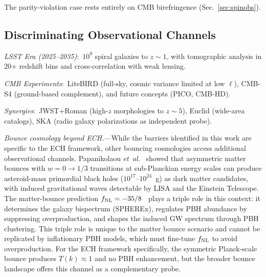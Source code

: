 \documentclass[aps,prd,twocolumn,superscriptaddress,showpacs,preprintnumbers,nofootinbib,longbibliography,floatfix]{revtex4-2}
\newcommand{\etal}{\textit{et~al.}}
\newcommand{\fnl}{f_{\rm NL}}
\begin{document}
The parity-violation case rests entirely on CMB birefringence (Sec.~\ref{sec:spinobs}).

\subsection{Discriminating Observational Channels}

\textit{LSST Era (2025--2035)}:~$10^9$ spiral galaxies to $z \sim 1$, with tomographic analysis in 20+ redshift bins and cross-correlation with weak lensing.

\textit{CMB Experiments}:~LiteBIRD (full-sky, cosmic variance limited at low $\ell$), CMB-S4 (ground-based complement), and future concepts (PICO, CMB-HD).

\textit{Synergies}:~JWST+Roman (high-$z$ morphologies to $z\sim 5$), Euclid (wide-area catalogs), SKA (radio galaxy polarizations as independent probe).

\textit{Bounce cosmology beyond ECH.}---While the barriers identified in this work are specific to the ECH framework, other bouncing cosmologies access additional observational channels. Papanikolaou \etal~\cite{Papanikolaou:2024pbh} showed that asymmetric matter bounces with $w = 0 \to 1/3$ transitions at sub-Planckian energy scales can produce asteroid-mass primordial black holes ($10^{17}\text{--}10^{24}$~g) as dark matter candidates, with induced gravitational waves detectable by LISA and the Einstein Telescope. The matter-bounce prediction $\fnl = -35/8$~\cite{Cai:2009fn} plays a triple role in this context: it determines the galaxy bispectrum (SPHEREx), regulates PBH abundance by suppressing overproduction, and shapes the induced GW spectrum through PBH clustering. This triple role is unique to the matter bounce scenario and cannot be replicated by inflationary PBH models, which must fine-tune $\fnl$ to avoid overproduction. For the ECH framework specifically, the symmetric Planck-scale bounce produces $T(k) \approx 1$ and no PBH enhancement, but the broader bounce landscape offers this channel as a complementary probe.
\end{document}
